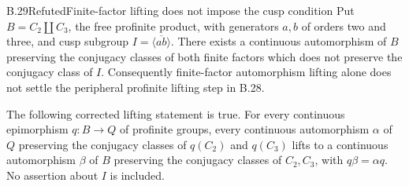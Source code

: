 \begin{statement}{B.29}{Refuted}{Finite-factor lifting does not impose the cusp condition}
Put $B=C_2\amalg C_3$, the free profinite product, with generators
$a,b$ of orders two and three, and cusp subgroup
$I=\overline{\langle ab\rangle}$. There exists a continuous
automorphism of $B$ preserving the conjugacy classes of both
finite factors which does not preserve the conjugacy class of $I$.
Consequently finite-factor automorphism lifting alone does not
settle the peripheral profinite lifting step in B.28.

The following corrected lifting statement is true. For every
continuous epimorphism $q:B\to Q$ of profinite groups, every
continuous automorphism $\alpha$ of $Q$ preserving the conjugacy
classes of $q(C_2)$ and $q(C_3)$ lifts to a continuous automorphism
$\beta$ of $B$ preserving the conjugacy classes of $C_2,C_3$,
with $q\beta=\alpha q$. No assertion about $I$ is included.
\end{statement}
